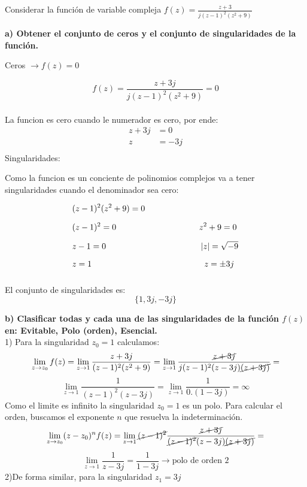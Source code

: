 \documentclass[12pt,a4paper]{report}
\begin{document}
\chapter{}%

Considerar la función de variable compleja $f(z) =\frac{z + 3}{j(z - 1)^2(z^2 + 9)}$

\textbf{a) Obtener el conjunto de ceros y el conjunto de singularidades de la función.}

Ceros $\rightarrow f(z)=0$

$$f(z)=\frac{z + 3j}{j(z - 1)^2(z^2 + 9)}=0$$\\
La funcion es cero cuando le numerador es cero, por ende:
\begin{align*}
z+3j&=0\\[6pt]
z&=-3j\\[6pt]
\end{align*}
Singularidades:

Como la funcion es un conciente de polinomios complejos va a tener singularidades cuando el denominador sea cero:

\begin{align*}
    &(z-1)^2(z^2+9)=0\\[6pt]
    &(z-1)^2=0 \hspace{3.5cm}    z^2+9=0\\[6pt]
    &z-1=0     \hspace{4cm}   |z|=\sqrt{-9}\\[6pt]
    &z=1       \hspace{4.75cm}  z=\pm3j\\[6pt]
\end{align*}

El conjunto de singularidades es: $$\{1,3j,-3j\}$$

\textbf{b) Clasificar todas y cada una de las singularidades de la función $f(z)$ en: Evitable, Polo (orden), Esencial.}\\[6pt]
1) Para la singularidad $z_0=1$ calculamos:
$$\lim_{z \to z_0}f(z)=\lim_{z \to 1}\frac{z+3j}{(z - 1)^2(z^2 + 9)}=\lim_{z \to 1}\frac{\cancel{z+3j}}{j(z - 1)^2(z-3j)\cancel{(z+3j)}}=$$
$$\lim_{z \to 1}\frac{1}{(z - 1)^2(z-3j)}=\lim_{z \to 1}\frac{1}{0.(1-3j)}=\infty$$
Como el limite es infinito la singularidad $z_0=1$ es un polo. Para calcular el orden, buscamos el exponente $n$ que resuelva
la indeterminación.\\
$$\lim_{z \to z_0}(z-z_0)^n f(z)=\lim_{z \to 1}\cancel{(z - 1)^2}\frac{\cancel{z+3j}}{\cancel{(z - 1)^2}(z-3j)\cancel{(z+3j)}}=$$
$$\lim_{z \to 1}\frac{1}{z-3j}=\frac{1}{1-3j}\rightarrow \text{polo de orden 2}$$
2)De forma similar, para la singularidad $z_1=3j$
\end{document}
